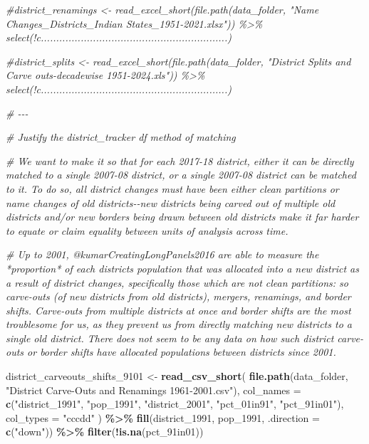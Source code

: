 \documentclass[
]{article}
\newenvironment{Shaded}{\begin{snugshade}}{\end{snugshade}}
\newcommand{\AttributeTok}[1]{\textcolor[rgb]{0.13,0.29,0.53}{#1}}
\newcommand{\CommentTok}[1]{\textcolor[rgb]{0.56,0.35,0.01}{\textit{#1}}}
\newcommand{\FunctionTok}[1]{\textcolor[rgb]{0.13,0.29,0.53}{\textbf{#1}}}
\newcommand{\NormalTok}[1]{#1}
\newcommand{\OtherTok}[1]{\textcolor[rgb]{0.56,0.35,0.01}{#1}}
\newcommand{\SpecialCharTok}[1]{\textcolor[rgb]{0.81,0.36,0.00}{\textbf{#1}}}
\newcommand{\StringTok}[1]{\textcolor[rgb]{0.31,0.60,0.02}{#1}}
\begin{document}
\begin{Shaded}
\begin{Highlighting}[]
\CommentTok{\#district\_renamings \textless{}{-} read\_excel\_short(file.path(data\_folder, "Name Changes\_Districts\_Indian States\_1951{-}2021.xlsx")) \%\textgreater{}\% select(!c.............................................................)}

\CommentTok{\#district\_splits \textless{}{-} read\_excel\_short(file.path(data\_folder, "District Splits and Carve outs{-}decadewise  1951{-}2024.xls")) \%\textgreater{}\% select(!c.............................................................)}


\CommentTok{\# {-}{-}{-}}


\CommentTok{\# Justify the district\_tracker df method of matching }

\CommentTok{\# We want to make it so that for each 2017{-}18 district, either it can be directly matched to a single 2007{-}08 district, or a single 2007{-}08 district can be matched to it. To do so, all district changes must have been either clean partitions or name changes of old districts{-}{-}new districts being carved out of multiple old districts and/or new borders being drawn between old districts make it far harder to equate or claim equality between units of analysis across time.}


\CommentTok{\# Up to 2001, @kumarCreatingLongPanels2016 are able to measure the *proportion* of each district\textquotesingle{}s population that was allocated into a new district as a result of district changes, specifically those which are not clean partitions: so carve{-}outs (of new districts from old districts), mergers, renamings, and border shifts. Carve{-}outs from multiple districts at once and border shifts are the most troublesome for us, as they prevent us from directly matching new districts to a single old district. There does not seem to be any data on how such district carve{-}outs or border shifts have allocated populations between districts since 2001.}

\NormalTok{district\_carveouts\_shifts\_9101 }\OtherTok{\textless{}{-}} \FunctionTok{read\_csv\_short}\NormalTok{(}
  \FunctionTok{file.path}\NormalTok{(data\_folder, }\StringTok{"District Carve{-}Outs and Renamings 1961{-}2001.csv"}\NormalTok{),}
  \AttributeTok{col\_names =} \FunctionTok{c}\NormalTok{(}\StringTok{"district\_1991"}\NormalTok{, }\StringTok{"pop\_1991"}\NormalTok{, }\StringTok{"district\_2001"}\NormalTok{, }\StringTok{"pct\_01in91"}\NormalTok{, }\StringTok{"pct\_91in01"}\NormalTok{),}
  \AttributeTok{col\_types =} \StringTok{"cccdd"}
\NormalTok{  ) }\SpecialCharTok{\%\textgreater{}\%} 
  \FunctionTok{fill}\NormalTok{(district\_1991, pop\_1991, }\AttributeTok{.direction =} \FunctionTok{c}\NormalTok{(}\StringTok{"down"}\NormalTok{)) }\SpecialCharTok{\%\textgreater{}\%} 
  \FunctionTok{filter}\NormalTok{(}\SpecialCharTok{!}\FunctionTok{is.na}\NormalTok{(pct\_91in01))}


\end{Highlighting}
\end{Shaded}
\end{document}
